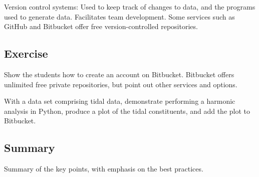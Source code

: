 \documentclass[a4paper,11pt]{article}
\begin{document}
Version control systems: Used to keep track of changes to data, and the programs used to generate data. Facilitates team development. Some services such as GitHub and Bitbucket offer free version-controlled repositories.

\subsection{Exercise}
Show the students how to create an account on Bitbucket. Bitbucket offers unlimited free private repositories, but point out other services and options.

With a data set comprising tidal data, demonstrate performing a harmonic analysis in Python, produce a plot of the tidal constituents, and add the plot to Bitbucket.

\subsection{Summary}
Summary of the key points, with emphasis on the best practices.
\end{document}
